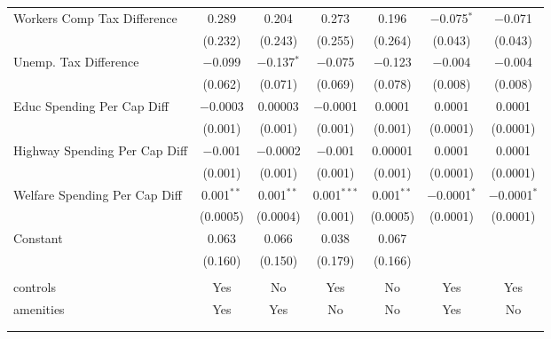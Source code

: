 \begin{table}[!htbp]
\begin{tabular}{@{\extracolsep{5pt}}lcccccc}
  Workers Comp Tax Difference & 0.289 & 0.204 & 0.273 & 0.196 & $-$0.075$^{*}$ & $-$0.071 \\ 
  & (0.232) & (0.243) & (0.255) & (0.264) & (0.043) & (0.043) \\ 
  Unemp. Tax Difference & $-$0.099 & $-$0.137$^{*}$ & $-$0.075 & $-$0.123 & $-$0.004 & $-$0.004 \\ 
  & (0.062) & (0.071) & (0.069) & (0.078) & (0.008) & (0.008) \\ 
  Educ Spending Per Cap Diff & $-$0.0003 & 0.00003 & $-$0.0001 & 0.0001 & 0.0001 & 0.0001 \\ 
  & (0.001) & (0.001) & (0.001) & (0.001) & (0.0001) & (0.0001) \\ 
  Highway Spending Per Cap Diff & $-$0.001 & $-$0.0002 & $-$0.001 & 0.00001 & 0.0001 & 0.0001 \\ 
  & (0.001) & (0.001) & (0.001) & (0.001) & (0.0001) & (0.0001) \\ 
  Welfare Spending Per Cap Diff & 0.001$^{**}$ & 0.001$^{**}$ & 0.001$^{***}$ & 0.001$^{**}$ & $-$0.0001$^{*}$ & $-$0.0001$^{*}$ \\ 
  & (0.0005) & (0.0004) & (0.001) & (0.0005) & (0.0001) & (0.0001) \\ 
  Constant & 0.063 & 0.066 & 0.038 & 0.067 &  &  \\ 
  & (0.160) & (0.150) & (0.179) & (0.166) &  &  \\ 
 \hline \\[-1.8ex] 
controls & Yes & No & Yes & No & Yes & Yes \\ 
amenities & Yes & Yes & No & No & Yes & No \\ 
\hline \\[-1.8ex] 
\hline 
\hline \\[-1.8ex] 
\end{tabular} 
\end{table} 
